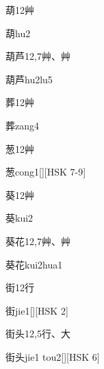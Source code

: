 \begin{Entry}{葫}{12}{⾋}
  \begin{Phonetics}{葫}{hu2}
  \end{Phonetics}
\end{Entry}

\begin{Entry}{葫芦}{12,7}{⾋、⾋}
  \begin{Phonetics}{葫芦}{hu2lu5}
  \end{Phonetics}
\end{Entry}

\begin{Entry}{葬}{12}{⾋}
  \begin{Phonetics}{葬}{zang4}
  \end{Phonetics}
\end{Entry}

\begin{Entry}{葱}{12}{⾋}
  \begin{Phonetics}{葱}{cong1}[][HSK 7-9]
  \end{Phonetics}
\end{Entry}

\begin{Entry}{葵}{12}{⾋}
  \begin{Phonetics}{葵}{kui2}
  \end{Phonetics}
\end{Entry}

\begin{Entry}{葵花}{12,7}{⾋、⾋}
  \begin{Phonetics}{葵花}{kui2hua1}
  \end{Phonetics}
\end{Entry}

\begin{Entry}{街}{12}{⾏}
  \begin{Phonetics}{街}{jie1}[][HSK 2]
  \end{Phonetics}
\end{Entry}

\begin{Entry}{街头}{12,5}{⾏、⼤}
  \begin{Phonetics}{街头}{jie1 tou2}[][HSK 6]
  \end{Phonetics}
\end{Entry}

